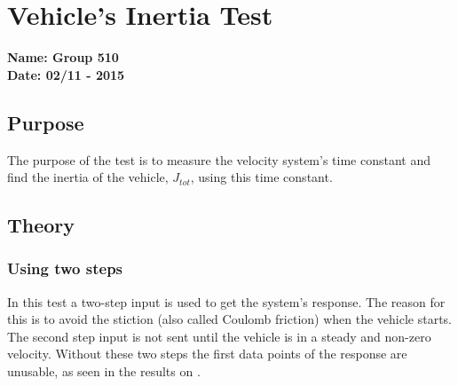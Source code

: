 \pagebreak
\section{Vehicle's Inertia Test} \label{app:inertiaTest}
\textbf{Name: Group 510}\\
\textbf{Date: 02/11 - 2015}

\subsection{Purpose}
The purpose of the test is to measure the velocity system's time constant and find the inertia of the vehicle, $J_{tot}$, using this time constant.
\subsection{Theory}



\subsubsection{Using two steps}
In this test a two-step input is used to get the system's response. The reason for this is to avoid the stiction (also called Coulomb friction) when the vehicle starts. The second step input is not sent until the vehicle is in a steady and non-zero velocity. Without these two steps the first data points of the response are unusable, as seen in the results on .

